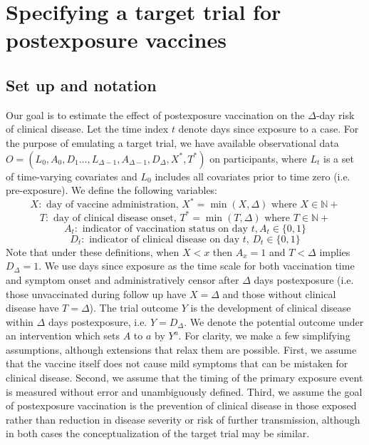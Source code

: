 \documentclass[11pt]{article}
\begin{document}

\section{Specifying a target trial for postexposure vaccines}

\subsection{Set up and notation} \label{sec:setup}
Our goal is to estimate the effect of postexposure vaccination on the $\Delta$-day risk of clinical disease. Let the time index $t$ denote days since exposure to a case. For the purpose of emulating a target trial, we have available observational data $O=\left(L_0, A_0, D_1 \ldots, L_{\Delta-1}, A_{\Delta-1}, D_{\Delta}, X^*, T^*\right)$ on participants, where $L_t$ is a set of time-varying covariates and $L_0$ includes all covariates prior to time zero (i.e. pre-exposure). We define the following variables:
$$X: \text{ day of vaccine administration, } X^* = \operatorname{min}(X, \Delta) \text{ where } X \in \mathbb{N}+$$
$$T: \text{ day of clinical disease onset, } T^* = \operatorname{min}(T, \Delta) \text{ where } T \in \mathbb{N}+$$
$$A_t: \text{ indicator of vaccination status on day }t, A_t \in \{0, 1\}$$
$$D_t: \text{ indicator of clinical disease on day $t$, } D_t \in \{0, 1\}$$
Note that under these definitions, when $X < x$ then $A_x = 1$ and $T < \Delta$ implies $D_{\Delta} = 1$. We use days since exposure as the time scale for both vaccination time and symptom onset and administratively censor after $\Delta$ days postexposure (i.e. those unvaccinated during follow up have $X = \Delta$ and those without clinical disease have $T = \Delta$). The trial outcome $Y$ is the development of clinical disease within $\Delta$ days postexposure, i.e. $Y=D_{\Delta}$. We denote the potential outcome under an intervention which sets $A$ to $a$ by $Y^a$. For clarity, we make a few simplifying assumptions, although extensions that relax them are possible. First, we assume that the vaccine itself does not cause mild symptoms that can be mistaken for clinical disease. Second, we assume that the timing of the primary exposure event is measured without error and unambiguously defined. Third, we assume the goal of postexposure vaccination is the prevention of clinical disease in those exposed rather than reduction in disease severity or risk of further transmission, although in both cases the conceptualization of the target trial may be similar.
\end{document}
